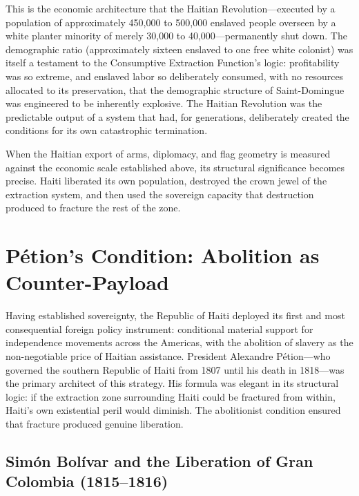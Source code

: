 This is the economic architecture that the Haitian Revolution---executed by a population of approximately 450,000 to 500,000 enslaved people overseen by a white planter minority of merely 30,000 to 40,000---permanently shut down. The demographic ratio (approximately sixteen enslaved to one free white colonist) was itself a testament to the Consumptive Extraction Function's logic: profitability was so extreme, and enslaved labor so deliberately consumed, with no resources allocated to its preservation, that the demographic structure of Saint-Domingue was engineered to be inherently explosive. The Haitian Revolution was the predictable output of a system that had, for generations, deliberately created the conditions for its own catastrophic termination.

When the Haitian export of arms, diplomacy, and flag geometry is measured against the economic scale established above, its structural significance becomes precise. Haiti liberated its own population, destroyed the crown jewel of the extraction system, and then used the sovereign capacity that destruction produced to fracture the rest of the zone.

\section{Pétion's Condition: Abolition as Counter-Payload}
\label{sec:petion_condition}

Having established sovereignty, the Republic of Haiti deployed its first and most consequential foreign policy instrument: conditional material support for independence movements across the Americas, with the abolition of slavery as the non-negotiable price of Haitian assistance. President Alexandre Pétion---who governed the southern Republic of Haiti from 1807 until his death in 1818---was the primary architect of this strategy. His formula was elegant in its structural logic: if the extraction zone surrounding Haiti could be fractured from within, Haiti's own existential peril would diminish. The abolitionist condition ensured that fracture produced genuine liberation.

\subsection{Simón Bolívar and the Liberation of Gran Colombia (1815--1816)}

